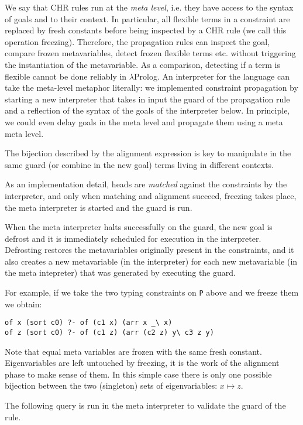 \documentclass{easychair}
\begin{document}
We say that CHR rules run at the \emph{meta level}, i.e. they have access
to the syntax of goals and to their context.  In particular, all flexible
terms in a constraint are replaced by fresh constants before being inspected
by a CHR rule (we call this operation freezing). Therefore, the propagation
rules can inspect the goal, compare frozen metavariables, detect frozen flexible terms etc. without triggering the instantiation of the metavariable. As a comparison, detecting if a term is flexible cannot be done reliably in $\lambda$Prolog. An interpreter for the language can take the meta-level metaphor literally: we implemented constraint propagation by starting a new interpreter that takes in input the guard of the propagation rule and a reflection of the syntax of the goals of the interpreter below. In principle, we could even delay goals in the meta level and propagate them using a meta meta level.

The bijection described by the alignment expression is key to
manipulate in the same guard (or combine in the new goal) terms
living in different contexts.

As an implementation detail, heads are \emph{matched} against the
constraints by the interpreter, and only when matching and alignment succeed,
freezing takes place, the meta interpreter is started and the guard is run.

When the meta interpreter halts successfully on the guard, the new goal is
defrost and it is immediately scheduled for execution in the interpreter.
Defrosting restores the metavariables originally present in the constraints, and it also creates a new metavariable (in the interpreter) for each new metavariable (in the meta intepreter) that was generated by executing the guard.

For example, if we take the two typing constraints on \verb+P+ above
and we freeze them we obtain:

\begin{Verbatim}
of x (sort c0) ?- of (c1 x) (arr x _\ x)
of z (sort c0) ?- of (c1 z) (arr (c2 z) y\ c3 z y)
\end{Verbatim}

Note that equal meta variables are frozen with the same fresh
constant.  Eigenvariables are left untouched by freezing, it is
the work of the alignment phase to make sense of them.
In this simple case there is only one possible bijection
between the two (singleton) sets of eigenvariables: 
$x \mapsto z$.

The following query is run in the meta interpreter to validate the guard of the rule.
\end{document}
